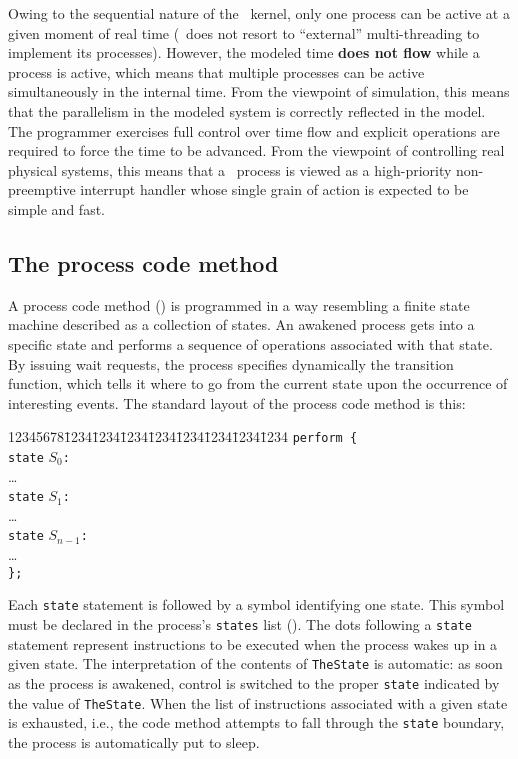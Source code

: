 Owing to the sequential nature of the \smurph\ kernel, only one process
can be active at a given moment of real time (\smurph\ does not resort
to ``external'' multi-threading to implement its processes).
However, the modeled time {\bf does not flow} while a process is active,
which means that multiple
processes can be active simultaneously in the internal time.
From the viewpoint of simulation, this means that the parallelism in the
modeled system is correctly reflected in the model.
The programmer exercises full control over time flow and
explicit operations are required to force the time to be advanced.
From the viewpoint of controlling real physical systems, this means that
a \smurph\ process is viewed as a high-priority non-preemptive
interrupt handler whose single grain of action is expected to be simple and
fast.

\subsection{The process code method}
\label{rm_pr_pc}

A process code method () is programmed in a way resembling
a finite state machine described as a collection of states.
An awakened process gets into a specific state
and performs a sequence of operations associated with that state.
By issuing wait requests, the process specifies dynamically the transition
function, which tells it where to go from the current state upon the occurrence
of interesting events.
The standard layout of the process code method is this:
{\tt\begin{tabbing}
12345678\=1234\=1234\=1234\=1234\=1234\=1234\=1234\=1234\kill
\> {\tt perform \{} \\
\> \> {\tt state} $S_0${\tt :} \\
\> \> \> \ldots \\
\> \> {\tt state} $S_1${\tt :} \\
\> \> \> \ldots \\
\> \> {\tt state} $S_{n-1}${\tt :} \\
\> \> \> \ldots \\
\> {\tt \};}
\end{tabbing}}

Each {\tt state} statement is followed by a symbol identifying one
state.
This symbol must be declared in the process's
{\tt states} list ().
The dots following a {\tt state} statement represent
instructions to be executed when the process wakes up in a given state.
The interpretation of the contents of {\tt TheState} is automatic:
as soon as the process is awakened, control is switched to the proper
{\tt state} indicated by the value of {\tt TheState}.
When the list of instructions associated with a given state is
exhausted, i.e., the code method attempts to fall through the {\tt state}
boundary, the process is automatically put to sleep.

